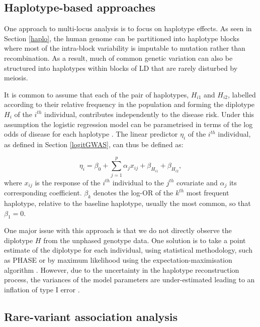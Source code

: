 \documentclass[]{book}
\begin{document}
\hypertarget{haplotype-based-approaches}{%
\subsection{Haplotype-based approaches}\label{haplotype-based-approaches}}

One approach to multi-locus analysis is to focus on haplotype effects.
As seen in Section \ref{haplo}, the human genome can be partitioned
into haplotype blocks where most of the intra-block variability is
imputable to mutation rather than recombination. As a result, much of
common genetic variation can also be structured into haplotypes within
blocks of LD that are rarely disturbed by meiosis.

It is common to assume that each of the pair of haplotypes, \(H_{i1}\) and
\(H_{i2}\), labelled according to their relative frequency in the
population and forming the diplotype \(H_i\) of the \(i^{th}\) individual,
contributes independently to the disease risk. Under this assumption the
logistic regression model can be parametrised in terms of the log odds
of disease for each haplotype \citep{balding2008handbook}. The linear
predictor \(\eta_i\) of the \(i^{th}\) individual, as defined in Section
\ref{logitGWAS}, can thus be defined as:

\[\eta_i = \beta_0 + \sum_{j=1}^p \alpha_j x_{ij} + \beta_{H_{i1}} + \beta_{H_{i2}},\]
where \(x_{ij}\) is the response of the \(i^{th}\) individual to the
\(j^{th}\) covariate and \(\alpha_j\) its corresponding coefficient.
\(\beta_k\) denotes the log-OR of the \(k^{th}\) most frequent haplotype,
relative to the baseline haplotype, usually the most common, so that
\(\beta_1 = 0\).

One major issue with this approach is that we do not directly observe
the diplotype \(H\) from the unphased genotype data. One solution is to
take a point estimate of the diplotype for each individual, using
statistical methodology, such as PHASE \citep{stephens2001new} or by maximum
likelihood using the expectation-maximisation algorithm
\citep{excoffier1995maximum}. However, due to the uncertainty in the
haplotype reconstruction process, the variances of the model parameters
are under-estimated leading to an inflation of type I error
\citep{balding2008handbook}.

\hypertarget{rare-variant}{%
\subsection{Rare-variant association analysis}\label{rare-variant}}
\end{document}
